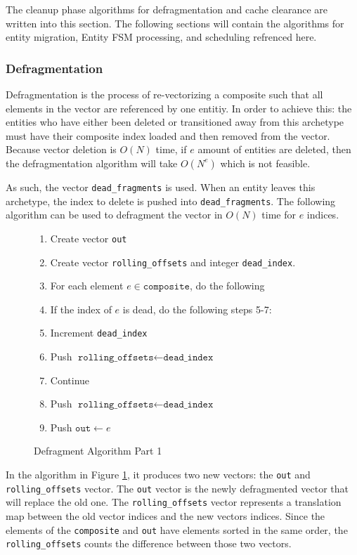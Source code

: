 The cleanup phase algorithms for defragmentation and cache clearance are written into this section. The following sections will contain the algorithms for entity migration, Entity FSM processing, and scheduling refrenced here.

\subsubsection{Defragmentation}
Defragmentation is the process of re-vectorizing a composite such that all elements in the vector are referenced by one entitiy. In order to achieve this: the entities who have either been deleted or transitioned away from this archetype must have their composite index loaded and then removed from the vector. Because vector deletion is $O(N)$ time, if $e$ amount of entities are deleted, then the defragmentation algorithm will take $O(N^e)$ which is not feasible. 

As such, the vector \texttt{dead\_fragments} is used. When an entity leaves this archetype, the index to delete is pushed into \texttt{dead\_fragments}. The following algorithm can be used to defragment the vector in $O(N)$ time for $e$ indices.

\begin{figure}[htbp]
    \begin{enumerate}
        \item Create vector \texttt{out}
        \item Create vector \texttt{rolling\_offsets} and integer \texttt{dead\_index}.
        \item For each element $ e \in \texttt{composite}$, do the following
        \item If the index of $e$ is dead, do the following steps 5-7:
        \item Increment \texttt{dead\_index}
        \item Push $\texttt{rolling\_offsets} \leftarrow \texttt{dead\_index}$
        \item Continue
        \item Push $\texttt{rolling\_offsets} \leftarrow \texttt{dead\_index}$
        \item Push $\texttt{out} \leftarrow e$
    \end{enumerate}
    \caption{Defragment Algorithm Part 1}
    \label{alg:defrag1}
\end{figure}

In the algorithm in Figure \ref{alg:defrag1}, it produces two new vectors: the \texttt{out} and \texttt{rolling\_offsets} vector. The \texttt{out} vector is the newly defragmented vector that will replace the old one. The \texttt{rolling\_offsets} vector represents a translation map between the old vector indices and the new vectors indices. Since the elements of the \texttt{composite} and \texttt{out} have elements sorted in the same order, the \texttt{rolling\_offsets} counts the difference between those two vectors.
                  
